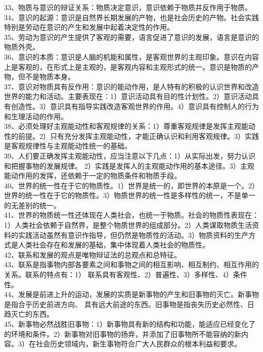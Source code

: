 \documentclass[a4paper,fleqn]{article}
\begin{document}
33、物质与意识的辩证关系：物质决定意识，意识依赖于物质并反作用于物质。 \\
34、意识的起源：意识是自然界长期发展的产物，也是社会历史的产物。社会实践特别是劳动在意识的产生和发展中起着决定性的作用。 \\
35、劳动为意识的产生提供了客观的需要，语言促进了意识的发展，语言是意识的物质外壳。 \\
36、意识的本质：意识是人脑的机能和属性，是客观世界的主观印象。意识在内容上是客观的，在形式上是主观的，是客观内容和主观形式的统一。意识是物质的产物，但不是物质本身。 \\
37、意识对物质具有反作用：意识的能动作用，是人特有的积极的认识世界和改造世界的能力和活动。主要表现在：1）意识活动具有目的性计划性。2）意识活动具有创造性。3）意识具有指导实践改造客观世界的作用。4）意识具有控制人的行为和生理活动的作用。 \\
38、必须处理好主观能动性和客观规律的关系：1）尊重客观规律是发挥主观能动性的前提。2）只有充分发挥主观能动性，才能正确认识和利用客观规律。3）实践是客观规律性与主观能动性统一的基础。 \\
39、人们要正确发挥主观能动性，应当注意以下几点：1）从实际出发，努力认识和把握事物的发展规律。 2）实践是发挥人的主观能动作用的基本途径。3）主观能动作用的发挥，还依赖于一定的物质条件和物质手段。 \\
40、世界的统一性在于它的物质性。1）世界是统一的，即世界的本原是一个。2）世界的统一性在于它的物质性。3）物质世界的统一性是多样性的统一，不是单一的无差别的统一。 \\
41、世界的物质统一性还体现在人类社会，也统一于物质。社会的物质性表现在：1）人类社会依赖于自然界，是整个物质世界的组成部分。2）人类谋取物质生活资料的实践活动虽然有意识作指导，但仍然是物质性的活动。3）物质资料的生产方式是人类社会存在和发展的基础，集中体现着人类社会的物质性。 \\
42、联系和发展的观点是唯物辩证法的总观点和总特征。 \\
43、联系是指事物内部各要素之间和事物之间的相互影响、相互制约、相互作用的关系。联系的特点有：1） 联系具有客观性、2）普遍性、3）多样性、4）条件性。 \\
44、发展是前进上升的运动，发展的实质是新事物的产生和旧事物的灭亡。新事物是指合乎历史前进方向、 具有远大前途的东西。旧事物是指丧失历史必然性、日趋灭亡的东西。 \\
45、新事物必然战胜旧事物：1）新事物具有新的结构和功能，能适应已经变化了的环境和条件。2）新事物对旧事物的扬弃，并添加了旧事物所不能容纳的新内容。3）在社会历史领域内，新生事物符合广大人民群众的根本利益和要求。 \\
\end{document}
